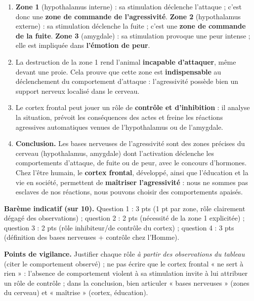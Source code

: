 \documentclass[11pt]{article}
\begin{document}
\begin{corrige}
\begin{enumerate}
\item \textbf{Zone 1} (hypothalamus interne) : sa stimulation déclenche l'attaque ; c'est donc une \textbf{zone de commande de l'agressivité}. \textbf{Zone 2} (hypothalamus externe) : sa stimulation déclenche la fuite ; c'est une \textbf{zone de commande de la fuite}. \textbf{Zone 3} (amygdale) : sa stimulation provoque une peur intense ; elle est impliquée dans \textbf{l'émotion de peur}.
\item La destruction de la zone 1 rend l'animal \textbf{incapable d'attaquer}, même devant une proie. Cela prouve que cette zone est \textbf{indispensable} au déclenchement du comportement d'attaque : l'agressivité possède bien un support nerveux localisé dans le cerveau.
\item Le cortex frontal peut jouer un rôle de \textbf{contrôle et d'inhibition} : il analyse la situation, prévoit les conséquences des actes et freine les réactions agressives automatiques venues de l'hypothalamus ou de l'amygdale.
\item \textbf{Conclusion.} Les bases nerveuses de l'agressivité sont des zones précises du cerveau (hypothalamus, amygdale) dont l'activation déclenche les comportements d'attaque, de fuite ou de peur, avec le concours d'hormones. Chez l'être humain, le \textbf{cortex frontal}, développé, ainsi que l'éducation et la vie en société, permettent de \textbf{maîtriser l'agressivité} : nous ne sommes pas esclaves de nos réactions, nous pouvons choisir des comportements apaisés.
\end{enumerate}
\textbf{Barème indicatif (sur 10).} Question 1 : 3 pts (1 pt par zone, rôle clairement dégagé des observations) ; question 2 : 2 pts (nécessité de la zone 1 explicitée) ; question 3 : 2 pts (rôle inhibiteur/de contrôle du cortex) ; question 4 : 3 pts (définition des bases nerveuses + contrôle chez l'Homme).

\textbf{Points de vigilance.} Justifier chaque rôle \emph{à partir des observations du tableau} (citer le comportement observé) ; ne pas écrire que le cortex frontal « ne sert à rien » : l'absence de comportement violent à sa stimulation invite à lui attribuer un rôle de contrôle ; dans la conclusion, bien articuler « bases nerveuses » (zones du cerveau) et « maîtrise » (cortex, éducation).
\end{corrige}
\end{document}
